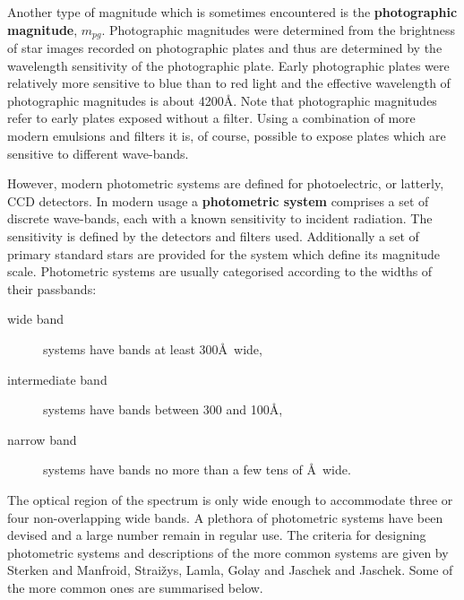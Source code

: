 \documentclass[twoside,11pt,nolof]{starlink}
\begin{document}
Another type of magnitude which is sometimes encountered is the \textbf{photographic magnitude}, $m_{pg}$.  Photographic magnitudes were
determined from the brightness of star images recorded on photographic
plates and thus are determined by the wavelength sensitivity of the
photographic plate.  Early photographic plates were relatively more
sensitive to blue than to red light and the effective wavelength
of photographic magnitudes is about 4200\AA.  Note that photographic
magnitudes refer to early plates exposed without a filter.  Using a
combination of more modern emulsions and filters it is, of course,
possible to expose plates which are sensitive to different wave-bands.

However, modern photometric systems are defined for photoelectric,
or latterly, CCD detectors.  In modern usage a \textbf{photometric system}
comprises a set of discrete wave-bands, each with a known sensitivity
to incident radiation.  The sensitivity is defined by the detectors
and filters used.  Additionally a set of primary standard stars are
provided for the system which define its magnitude scale.  Photometric
systems are usually categorised according to the widths of their
passbands:

\begin{description}

  \item[wide band] systems have bands at least 300\AA\ wide,

  \item[intermediate band] systems have bands between 300 and 100\AA,

  \item[narrow band] systems have bands no more than a few tens of
   \AA\ wide.

\end{description}

The optical region of the spectrum is only wide enough to accommodate
three or four non-overlapping wide bands.  A plethora of photometric
systems have been devised and a large number remain in regular use.
The criteria for designing photometric systems and descriptions of the
more common systems are given by Sterken and Manfroid\cite{STERKEN92},
Strai\v{z}ys\cite{STRAIZYS92}, Lamla\cite{LAMLA82}, Golay\cite{GOLAY74}
and Jaschek and Jaschek\cite{JASCHEK87}.  Some of the more common ones
are summarised below.
\end{document}
